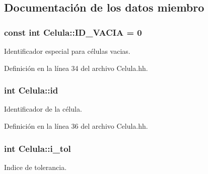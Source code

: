 \subsection{\-Documentación de los datos miembro}
\hypertarget{class_celula_affff67b41ead0b1f3a3f4faad6c049ac}{
\subsubsection[{\-I\-D\-\_\-\-V\-A\-C\-I\-A}]{\setlength{\rightskip}{0pt plus 5cm}const int {\bf \-Celula\-::\-I\-D\-\_\-\-V\-A\-C\-I\-A} = 0}}\label{class_celula_affff67b41ead0b1f3a3f4faad6c049ac}


\-Identificador especial para células vacias. 



\-Definición en la línea 34 del archivo \-Celula.\-hh.

\hypertarget{class_celula_a0984a8b3deeed4979ed6f6141edc3c0c}{
\subsubsection[{id}]{\setlength{\rightskip}{0pt plus 5cm}int {\bf \-Celula\-::id}}}\label{class_celula_a0984a8b3deeed4979ed6f6141edc3c0c}


\-Identificador de la célula. 



\-Definición en la línea 36 del archivo \-Celula.\-hh.

\hypertarget{class_celula_abda46be7b30a13909d9819c46238080b}{
\subsubsection[{i\-\_\-tol}]{\setlength{\rightskip}{0pt plus 5cm}int {\bf \-Celula\-::i\-\_\-tol}}}\label{class_celula_abda46be7b30a13909d9819c46238080b}


\-Indice de tolerancia. 



